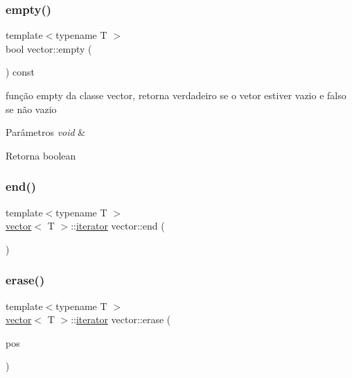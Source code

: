 \subsubsection{\texorpdfstring{empty()}{empty()}}
{\footnotesize\ttfamily template$<$typename T $>$ \\
bool vector\+::empty (\begin{DoxyParamCaption}\item[{void}]{ }\end{DoxyParamCaption}) const}

função empty da classe vector, retorna verdadeiro se o vetor estiver vazio e falso se não vazio 
\begin{DoxyParams}{Parâmetros}
{\em void} & \\
\hline
\end{DoxyParams}
\begin{DoxyReturn}{Retorna}
boolean 
\end{DoxyReturn}
\mbox{\label{classsc_1_1vector_a15b7f4313d7a011694d154c030768ad3}} 
\subsubsection{\texorpdfstring{end()}{end()}}
{\footnotesize\ttfamily template$<$typename T $>$ \\
\mbox{\hyperlink{classsc_1_1vector}{vector}}$<$ T $>$\+::\mbox{\hyperlink{classsc_1_1vector_1_1iterator}{iterator}} vector\+::end (\begin{DoxyParamCaption}\item[{void}]{ }\end{DoxyParamCaption})}

\mbox{\label{classsc_1_1vector_a09f7a21d470c64b5029839d39e2f6c06}} 
\subsubsection{\texorpdfstring{erase()}{erase()}\hspace{0.1cm}{\footnotesize\ttfamily [1/2]}}
{\footnotesize\ttfamily template$<$typename T $>$ \\
\mbox{\hyperlink{classsc_1_1vector}{vector}}$<$ T $>$\+::\mbox{\hyperlink{classsc_1_1vector_1_1iterator}{iterator}} vector\+::erase (\begin{DoxyParamCaption}\item[{\mbox{\hyperlink{classsc_1_1vector_1_1iterator}{iterator}}}]{pos }\end{DoxyParamCaption})}

